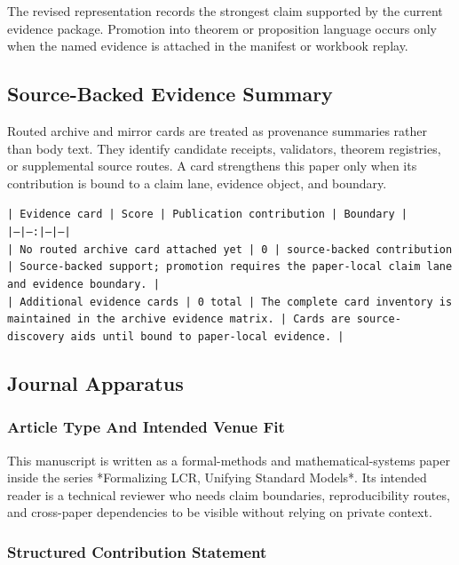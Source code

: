 \documentclass[11pt]{article}
\begin{document}
The revised representation records the strongest claim supported by the current evidence package. Promotion into theorem or proposition language occurs only when the named evidence is attached in the manifest or workbook replay.

\subsection*{Source-Backed Evidence Summary}

Routed archive and mirror cards are treated as provenance summaries rather than
body text. They identify candidate receipts, validators, theorem registries, or
supplemental source routes. A card strengthens this paper only when its
contribution is bound to a claim lane, evidence object, and boundary.

\noindent\texttt{| Evidence card | Score | Publication contribution | Boundary |}\\
\noindent\texttt{|---|---:|---|---|}\\
\noindent\texttt{| No routed archive card attached yet | 0 | source-backed contribution | Source-backed support; promotion requires the paper-local claim lane and evidence boundary. |}\\
\noindent\texttt{| Additional evidence cards | 0 total | The complete card inventory is maintained in the archive evidence matrix. | Cards are source-discovery aids until bound to paper-local evidence. |}\\

\subsection*{Journal Apparatus}

\subsubsection*{Article Type And Intended Venue Fit}

This manuscript is written as a formal-methods and mathematical-systems paper
inside the series *Formalizing LCR, Unifying Standard Models*. Its intended
reader is a technical reviewer who needs claim boundaries, reproducibility
routes, and cross-paper dependencies to be visible without relying on private
context.

\subsubsection*{Structured Contribution Statement}
\end{document}
